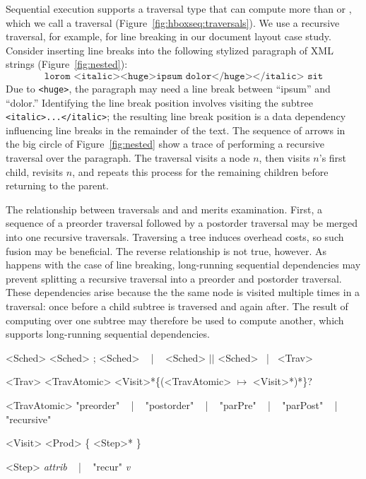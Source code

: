 Sequential execution supports a traversal type that can compute more than  or , which we call a  traversal (Figure~\ref{fig:hboxseq:traversals}). We use a recursive traversal, for example, for line breaking in our document layout case study. Consider inserting line breaks into the following stylized paragraph of XML strings (Figure~\ref{fig:nested}):
%
$$\texttt{lorom <italic><huge>ipsum dolor</huge></italic> sit}$$
%
Due to \texttt{<huge>}, the paragraph may need a line break between ``ipsum'' and ``dolor.''  Identifying the line break position involves visiting the subtree  \texttt{<italic>...</italic>}; the resulting line break position is a data dependency influencing line breaks in the remainder of the text. The sequence of arrows in the big circle of Figure~\ref{fig:nested} show a trace of performing a recursive traversal over the paragraph. The traversal visits a node $n$, then visits $n$'s first child, revisits $n$, and repeats this process for the remaining children before returning to the parent. 

The relationship between  traversals and  and  merits examination. First, a sequence of a preorder traversal followed by a postorder traversal may be merged into one recursive traversals. Traversing a tree induces overhead costs, so such fusion may be beneficial. The reverse  relationship is not true, however. As happens with the case of line breaking, long-running sequential dependencies may prevent splitting a recursive traversal into a preorder and postorder traversal. These dependencies arise because the the same node is visited multiple times in a traversal: once before a child subtree is traversed and again after. The result of computing over one subtree may therefore be used to compute another, which supports long-running sequential dependencies. 


\newsavebox{\decomplang}
\begin{lrbox}{\decomplang}%
\begin{minipage}{1\columnwidth}
\renewcommand{\litleft}{\bfseries}
\renewcommand{\ulitleft}{\bfseries}
\renewcommand{\superscript}[1]{\ensuremath{^{\textrm{#1}}}}
\renewcommand{\subscript}[1]{\ensuremath{_{\textrm{\uppercase{#1}}}}}
\renewcommand{\syntleft}{\normalfont\itshape\texttt{<}}
\renewcommand{\syntright}{\texttt{>}}
\begin{grammar}
<Sched> \deriv{} <Sched> ; <Sched>  ~ | ~ <Sched> $\vert\vert$ <Sched>  ~|~ <Trav>

<Trav> \deriv{} <TravAtomic> <Visit>*\{(<TravAtomic> $\mapsto$ <Visit>*)*\}?

<TravAtomic>  \deriv{} "preorder" ~ | ~ "postorder" ~ | ~ "parPre"  ~ | ~  "parPost"  ~ | ~  "recursive" ~ 

<Visit> \deriv{} <Prod>  \{ <Step>* \}

<Step> \deriv{} \emph{attrib} ~ | ~ "recur" \emph{v}
\end{grammar}
\end{minipage}
\end{lrbox}


